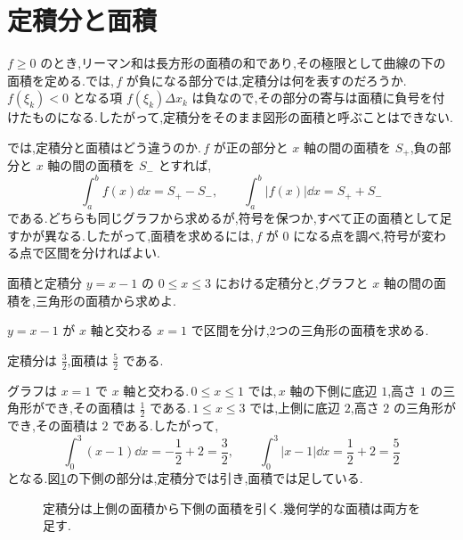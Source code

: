 \section{定積分と面積}\label{節:積分符号面積}
$f\ge0$ のとき,リーマン和は長方形の面積の和であり,その極限として曲線の下の面積を定める.では,\,$f$ が負になる部分では,定積分は何を表すのだろうか.\,$f(\xi_k)<0$ となる項 $f(\xi_k)\Delta x_k$ は負なので,その部分の寄与は面積に負号を付けたものになる.したがって,定積分をそのまま図形の面積と呼ぶことはできない.

では,定積分と面積はどう違うのか.\,$f$ が正の部分と $x$ 軸の間の面積を $S_+$,負の部分と $x$ 軸の間の面積を $S_-$ とすれば,
\[
 \int_a^b f(x)\dd x=S_+-S_-,\qquad
 \int_a^b|f(x)|\dd x=S_++S_-
\]
である.どちらも同じグラフから求めるが,符号を保つか,すべて正の面積として足すかが異なる.したがって,面積を求めるには,\,$f$ が $0$ になる点を調べ,符号が変わる点で区間を分ければよい.

\begin{example}{面積と定積分}
$y=x-1$ の $0\le x\le3$ における定積分と,グラフと $x$ 軸の間の面積を,三角形の面積から求めよ.
\end{example}
$y=x-1$ が $x$ 軸と交わる $x=1$ で区間を分け,2つの三角形の面積を求める.

定積分は $\frac32$,面積は $\frac52$ である.

グラフは $x=1$ で $x$ 軸と交わる.\,$0\le x\le1$ では,\,$x$ 軸の下側に底辺 $1$,高さ $1$ の三角形ができ,その面積は $\frac12$ である.\,$1\le x\le3$ では,上側に底辺 $2$,高さ $2$ の三角形ができ,その面積は $2$ である.したがって,
\[
 \int_0^3(x-1)\dd x=-\frac12+2=\frac32,
 \qquad
 \int_0^3|x-1|\dd x=\frac12+2=\frac52
\]
となる.図\ref{図:定積分符号}の下側の部分は,定積分では引き,面積では足している.

\begin{figure}[htbp]
\centering
{}
\caption{定積分は上側の面積から下側の面積を引く.幾何学的な面積は両方を足す.}
\label{図:定積分符号}
\end{figure}
